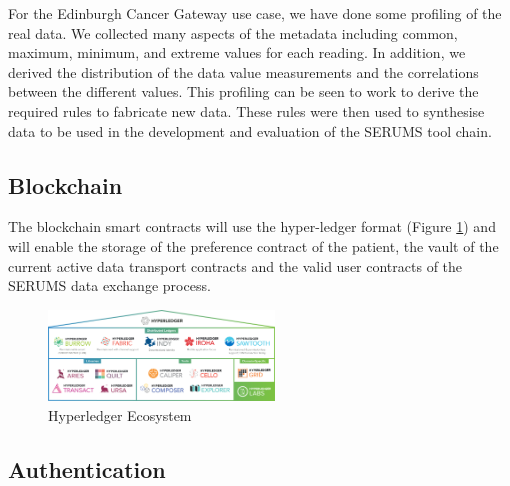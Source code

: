 For the Edinburgh Cancer Gateway use case, we have done some profiling of the real data.
We collected many aspects of the metadata including common, maximum, minimum, and extreme values for each reading. In addition, we derived the distribution of the data value measurements and the correlations between the different values. This profiling can be seen to work 
to derive the required rules to fabricate new data. These rules were then used to synthesise data to be used in the development and evaluation of the SERUMS tool chain.

\subsection{Blockchain}


The blockchain smart contracts will use the hyper-ledger format (Figure \ref{fig:hyperledger}) and will enable the storage of the preference contract of the patient, the vault of the current active data transport contracts and the valid user contracts of the SERUMS data exchange process.

\begin{figure}
    \centering
    \includegraphics[width=60mm]{images/hyperledger.png}
    \caption{Hyperledger Ecosystem}
    \label{fig:hyperledger}
\end{figure}


\subsection{Authentication}

